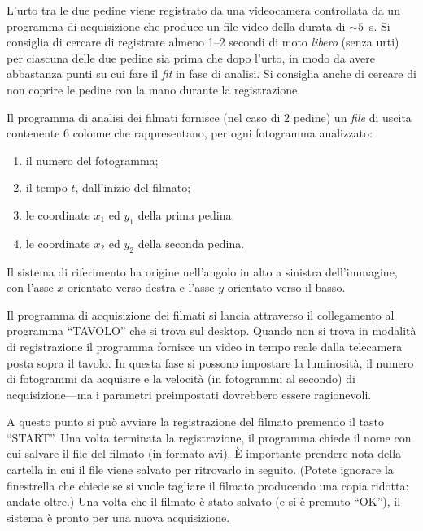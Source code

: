 \documentclass{lab1-article}
\begin{document}
\begin{article}

L'urto tra le due pedine viene registrato da una videocamera controllata da un
programma di acquisizione che produce un file video della durata di
$\sim 5$~s. Si consiglia di cercare di registrare almeno 1--2 secondi di moto
\emph{libero} (senza urti) per ciascuna delle due pedine sia prima che dopo
l'urto, in modo da avere abbastanza punti su cui fare il \emph{fit} in fase di
analisi. Si consiglia anche di cercare di non coprire
le pedine con la mano durante la registrazione. 

\subsecdataformat

Il programma di analisi dei filmati fornisce (nel caso di 2 pedine) un
\emph{file} di uscita contenente 6 colonne che rappresentano, per ogni
fotogramma analizzato:
\begin{enumerate}
\item il numero del fotogramma;
\item il tempo $t$, dall'inizio del filmato;
\item le coordinate $x_1$ ed $y_1$ della prima pedina.
\item le coordinate $x_2$ ed $y_2$ della seconda pedina.
\end{enumerate}

Il sistema di riferimento ha origine nell'angolo in alto a sinistra
dell'immagine, con l'asse $x$ orientato verso destra e l'asse $y$ orientato
verso il basso.




Il programma di acquisizione dei filmati si lancia attraverso il collegamento
al programma ``TAVOLO'' che si trova sul desktop. Quando non si trova in 
modalit\`a di registrazione il programma fornisce un video in tempo reale
dalla telecamera posta sopra il tavolo. In questa fase si possono impostare la
luminosit\`a, il numero di fotogrammi da acquisire e la velocit\`a (in
fotogrammi al secondo) di acquisizione---ma i parametri preimpostati dovrebbero
essere ragionevoli.

A questo punto si pu\`o avviare la registrazione del filmato premendo il tasto
``START''. Una volta terminata la registrazione, il programma chiede il nome
con cui salvare il file del filmato (in formato avi). \`E importante prendere
nota della cartella in cui il file viene salvato per ritrovarlo in seguito.
(Potete ignorare la finestrella che chiede se si vuole tagliare il filmato
producendo una copia ridotta: andate oltre.) Una volta che il filmato \`e stato
salvato (e si \`e premuto ``OK''), il sistema \`e pronto per una nuova
acquisizione.


\end{article}
\end{document}
